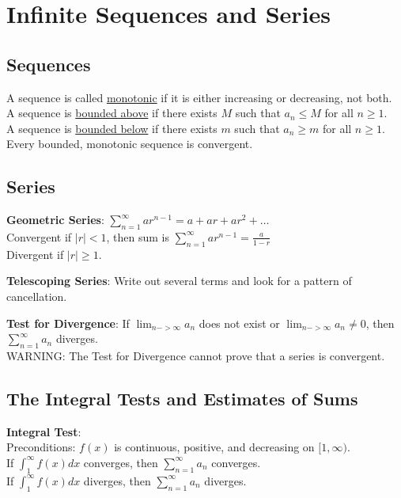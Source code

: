 \documentclass{article}
\begin{document}
\thispagestyle{fancy}

\addtolength{\parindent}{-.2in}

\section{Infinite Sequences and Series}
\subsection{Sequences}
A sequence is called \underline{monotonic} if it is either increasing or decreasing, not both. \\
A sequence is \underline{bounded above} if there exists $M$ such that $a_n \leq M$ for all $n\geq1$. \\
A sequence is \underline{bounded below} if there exists $m$ such that $a_n \geq m$ for all $n\geq1$. \\
Every bounded, monotonic sequence is convergent.

\subsection{Series}
\textbf{Geometric Series}: $\sum_{n=1}^{\infty} ar^{n-1} = a + ar + ar^2 + \ldots$ \\
Convergent if $|r| < 1$, then sum is $\sum_{n=1}^{\infty} ar^{n-1} = \frac{a}{1-r}$ \\
Divergent if $|r| \geq 1$.

\textbf{Telescoping Series}: Write out several terms and look for a pattern of cancellation.

\textbf{Test for Divergence}: If $\lim_{n->\infty} a_n$ does not exist or $\lim_{n->\infty} a_n \neq 0$,
then $\sum^{\infty}_{n=1} a_n$ diverges. \\
WARNING: The Test for Divergence cannot prove that a series is convergent.

\subsection{The Integral Tests and Estimates of Sums}
\textbf{Integral Test}:\\
Preconditions: $f(x)$ is continuous, positive, and decreasing on $[1,\infty)$.\\
If $\int^{\infty}_{1} f(x) dx$ converges, then $\sum_{n=1}^{\infty} a_n$ converges.\\
If $\int^{\infty}_{1} f(x) dx$ diverges, then $\sum_{n=1}^{\infty} a_n$ diverges.
\end{document}
